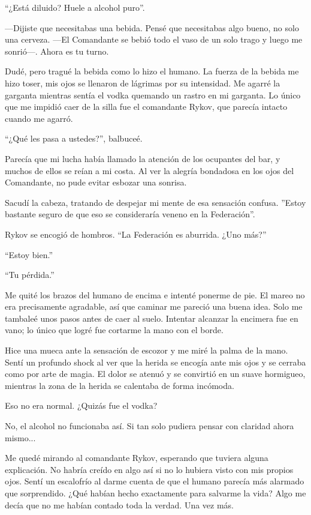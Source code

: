 ``¿Está diluido? Huele a alcohol puro''.

—Dijiste que necesitabas una bebida. Pensé que necesitabas algo bueno, no solo una cerveza. —El Comandante se bebió todo el vaso de un solo trago y luego me sonrió—. Ahora es tu turno.

Dudé, pero tragué la bebida como lo hizo el humano. La fuerza de la bebida me hizo toser, mis ojos se llenaron de lágrimas por su intensidad. Me agarré la garganta mientras sentía el vodka quemando un rastro en mi garganta. Lo único que me impidió caer de la silla fue el comandante Rykov, que parecía intacto cuando me agarró.

``¿Qué les pasa a ustedes?'', balbuceé.

Parecía que mi lucha había llamado la atención de los ocupantes del bar, y muchos de ellos se reían a mi costa. Al ver la alegría bondadosa en los ojos del Comandante, no pude evitar esbozar una sonrisa.

Sacudí la cabeza, tratando de despejar mi mente de esa sensación confusa. ''Estoy bastante seguro de que eso se consideraría veneno en la Federación''.

Rykov se encogió de hombros. ``La Federación es aburrida. ¿Uno más?''

``Estoy bien.''

``Tu pérdida.''

Me quité los brazos del humano de encima e intenté ponerme de pie. El mareo no era precisamente agradable, así que caminar me pareció una buena idea. Solo me tambaleé unos pasos antes de caer al suelo. Intentar alcanzar la encimera fue en vano; lo único que logré fue cortarme la mano con el borde.

Hice una mueca ante la sensación de escozor y me miré la palma de la mano. Sentí un profundo shock al ver que la herida se encogía ante mis ojos y se cerraba como por arte de magia. El dolor se atenuó y se convirtió en un suave hormigueo, mientras la zona de la herida se calentaba de forma incómoda.

Eso no era normal. ¿Quizás fue el vodka?

No, el alcohol no funcionaba así. Si tan solo pudiera pensar con claridad ahora mismo...

Me quedé mirando al comandante Rykov, esperando que tuviera alguna explicación. No habría creído en algo así si no lo hubiera visto con mis propios ojos. Sentí un escalofrío al darme cuenta de que el humano parecía más alarmado que sorprendido. ¿Qué habían hecho exactamente para salvarme la vida? Algo me decía que no me habían contado toda la verdad. Una vez más.

